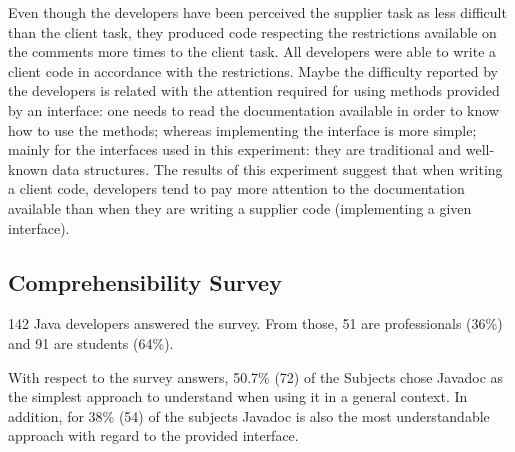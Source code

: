 Even though the developers have been perceived the supplier task as less
difficult than the client task, they produced code respecting the restrictions
available on the comments more times to the client task. All developers were
able to write a client code in accordance with the restrictions. Maybe the
difficulty reported by the developers is related with the attention required for
using methods provided by an interface: one needs to read the documentation
available in order to know how to use the methods; whereas implementing the
interface is more simple; mainly for the interfaces used in this experiment:
they are traditional and well-known data structures.
The results of this experiment suggest that when writing a client code,
developers tend to pay more attention to the documentation available than when
they are writing a supplier code (implementing a given interface).





\subsection{Comprehensibility Survey}
\label{sec:surveyResults}

142 Java developers answered the survey.
From those, 
51 are professionals (36\%) and 91 are students
(64\%).

With respect to the survey answers, 50.7\% (72) of the Subjects chose Javadoc as
the simplest approach to understand when using it in a general context. In addition,
for 38\% (54) of the subjects Javadoc is also the most understandable approach
with regard to the provided interface.

